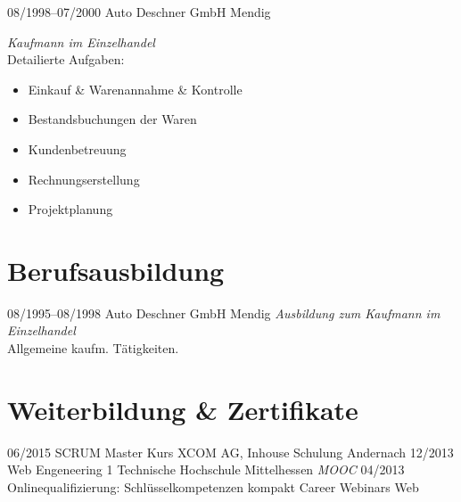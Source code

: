 \documentclass[a4paper,latin]{friggeri-cv} %
\begin{document}
\begin{entrylist}
\entry
{08/1998--07/2000}
{Auto Deschner GmbH}
{Mendig}
{\emph{Kaufmann im Einzelhandel}\\
Detailierte Aufgaben:
\begin{itemize}
\item Einkauf \& Warenannahme \& Kontrolle
\item Bestandsbuchungen der Waren
\item Kundenbetreuung
\item Rechnungserstellung
\item Projektplanung
\end{itemize}
}
\end{entrylist}

\section{Berufsausbildung}
\begin{entrylist}
\entry
{08/1995--08/1998}
{Auto Deschner GmbH}
{Mendig}
{\emph{Ausbildung zum Kaufmann im Einzelhandel}\\
Allgemeine kaufm. Tätigkeiten.
}
\end{entrylist}


\section{Weiterbildung \& Zertifikate}

\begin{entrylist}
\entry
{06/2015}
{SCRUM Master Kurs}
{XCOM AG, Inhouse Schulung}
{Andernach}
\entry
{12/2013}
{Web Engeneering 1}
{Technische Hochschule Mittelhessen}
{\emph{MOOC}}
\entry
{04/2013}
{Onlinequalifizierung: Schlüsselkompetenzen kompakt}
{Career Webinars}
{Web}
\end{entrylist}
\end{document}
